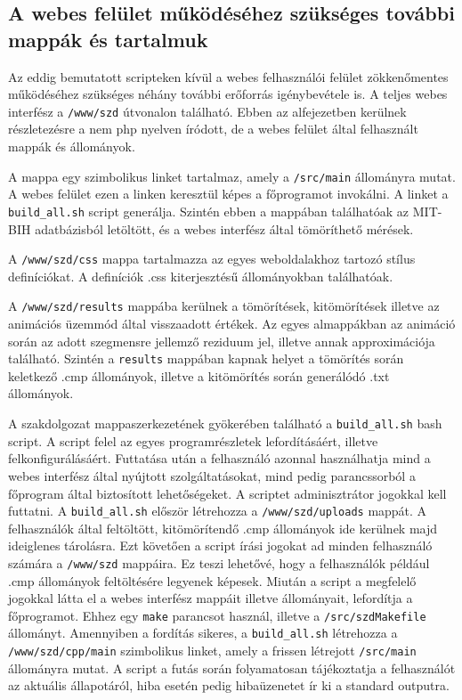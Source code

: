 \documentclass[oneside,titlepage,12pt,a4paper]{report}
\begin{document}
\subsection{A webes felület működéséhez szükséges további mappák és tartalmuk}

Az eddig bemutatott scripteken kívül a webes felhasználói felület zökkenőmentes működéséhez szükséges néhány további erőforrás igénybevétele is. A teljes webes interfész a \texttt{/www/szd} útvonalon található. Ebben az alfejezetben kerülnek részletezésre a nem php nyelven íródott, de a webes felület által felhasznált mappák és állományok.

\par A  mappa egy szimbolikus linket tartalmaz, amely a \texttt{/src/main} állományra mutat. A webes felület ezen a linken keresztül képes a főprogramot invokálni. A linket a \texttt{build\_all.sh} script generálja. Szintén ebben a mappában találhatóak az MIT-BIH adatbázisból letöltött, és a webes interfész által tömöríthető mérések. 
\par A \texttt{/www/szd/css} mappa tartalmazza az egyes weboldalakhoz tartozó stílus definíciókat. A definíciók .css kiterjesztésű állományokban találhatóak.
\par A \texttt{/www/szd/results} mappába kerülnek a tömörítések, kitömörítések illetve az animációs üzemmód által visszaadott értékek. Az egyes almappákban az animáció során az adott szegmensre jellemző reziduum jel, illetve annak approximációja található. Szintén a \texttt{results} mappában kapnak helyet a tömörítés során keletkező .cmp állományok, illetve a kitömörítés során generálódó .txt állományok. 

\par A szakdolgozat mappaszerkezetének gyökerében található a \texttt{build\_all.sh} bash script. A script felel az egyes programrészletek lefordításáért, illetve felkonfigurálásáért. Futtatása után a felhasználó azonnal használhatja mind a webes interfész által nyújtott szolgáltatásokat, mind pedig parancssorból a főprogram által biztosított lehetőségeket. A scriptet adminisztrátor jogokkal kell futtatni. A \texttt{build\_all.sh} először létrehozza a \texttt{/www/szd/uploads} mappát. A felhasználók által feltöltött, kitömörítendő .cmp állományok ide kerülnek majd ideiglenes tárolásra. Ezt követően a script 
írási jogokat ad minden felhasználó számára a \texttt{/www/szd} mappáira. Ez teszi lehetővé, hogy a felhasználók például .cmp állományok feltöltésére legyenek képesek. Miután a script a megfelelő jogokkal látta el a webes interfész mappáit illetve állományait, lefordítja a főprogramot. Ehhez egy \texttt{make} parancsot használ, illetve a \texttt{/src/szdMakefile} állományt. Amennyiben a fordítás sikeres, a \texttt{build\_all.sh} létrehozza a \texttt{/www/szd/cpp/main} szimbolikus linket, amely a frissen létrejott \texttt{/src/main} állományra mutat. A script a futás során folyamatosan tájékoztatja a felhasználót az aktuális állapotáról, hiba esetén pedig hibaüzenetet ír ki a standard outputra.  
\end{document}
